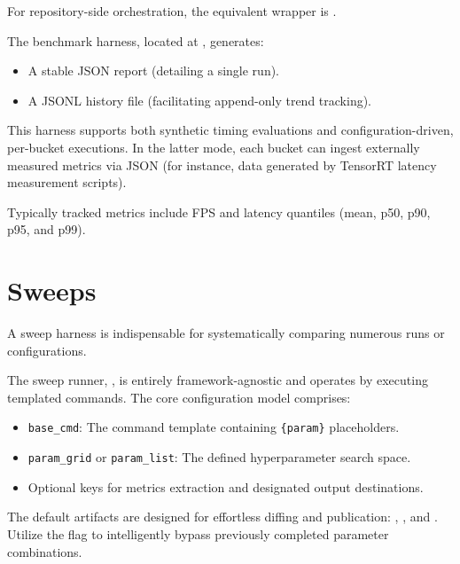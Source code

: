 For repository-side orchestration, the equivalent wrapper is
.

The benchmark harness, located at , generates:
\begin{itemize}
  \item A stable JSON report (detailing a single run).
  \item A JSONL history file (facilitating append-only trend tracking).
\end{itemize}

This harness supports both synthetic timing evaluations and configuration-driven, per-bucket executions. In the latter mode, each bucket can ingest externally measured metrics via JSON (for instance, data generated by TensorRT latency measurement scripts).

Typically tracked metrics include FPS and latency quantiles (mean, p50, p90, p95, and p99).

\section{Sweeps}
A sweep harness is indispensable for systematically comparing numerous runs or configurations.

The sweep runner, , is entirely framework-agnostic and operates by executing templated commands. The core configuration model comprises:
\begin{itemize}
  \item \texttt{base\_cmd}: The command template containing \texttt{\{param\}} placeholders.
  \item \texttt{param\_grid} or \texttt{param\_list}: The defined hyperparameter search space.
  \item Optional keys for metrics extraction and designated output destinations.
\end{itemize}

The default artifacts are designed for effortless diffing and publication:
, , and .
Utilize the  flag to intelligently bypass previously completed parameter combinations.
